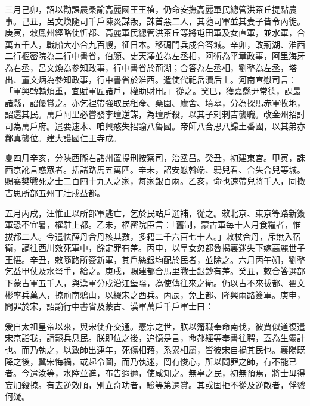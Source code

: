 \begin{pinyinscope}
 三月己卯，詔以勸課農桑諭高麗國王王禃，仍命安撫高麗軍民總管洪茶丘提點農事。己丑，呂文煥隨司千戶陳炎謀叛，誅首惡二人，其隨司軍並其妻子皆令內徙。庚寅，敕鳳州經略使忻都、高麗軍民總管洪茶丘等將屯田軍及女直軍，並水軍，合萬五千人，戰船大小合九百艘，征日本。移碉門兵戍合答城。辛卯，改荊湖、淮西二行樞密院為二行中書省，伯顏、史天澤並為左丞相，阿術為平章政事，阿里海牙為右丞，呂文煥為參知政事，行中書省於荊湖；合答為左丞相，劉整為左丞，塔出、董文炳為參知政事，行中書省於淮西。遣使代祀岳瀆后土。河南宣慰司言：「軍興轉輸煩重，宜賦軍匠諸戶，權助財用。」從之。癸巳，獲嘉縣尹常德，課最諸縣，詔優賞之。亦乞裡帶強取民租產、桑園、廬舍、墳墓，分為探馬赤軍牧地，詔還其民。萬戶阿里必嘗發李璮逆謀，為璮所殺，以其子剌剌吉襲職。改金州招討司為萬戶府。遣要速木、咱興憨失招諭八魯國。帝師八合思八歸土番國，以其弟亦鄰真襲位。建大護國仁王寺成。



 夏四月辛亥，分陜西隴右諸州置提刑按察司，治鞏昌。癸丑，初建東宮。甲寅，誅西京訛言惑眾者。括諸路馬五萬匹。辛未，詔安慰斡端、鴉兒看、合失合兒等城。賜襄樊戰死之士二百四十九人之家，每家銀百兩。乙亥，命也速帶兒將千人，同撒吉思所部五州丁壯戍益都。



 五月丙戌，汪惟正以所部軍逃亡，乞於民站戶選補，從之。敕北京、東京等路新簽軍恐不宜暑，權駐上都。乙未，樞密院臣言：「舊制，蒙古軍每十人月食糧者，惟拔都二人。今遣怯薛丹合丹核其數，多籍二千六百七十人。」敕杖合丹，斥無入宿衛，謫往西川效死軍中，餘定罪有差。丙申，以皇女忽都魯揭裏迷失下嫁高麗世子王愖。辛丑，敕隨路所簽新軍，其戶絲銀均配於民者，並除之。六月丙午朔，劉整乞益甲仗及水弩手，給之。庚戌，賜建都合馬里戰士銀鈔有差。癸丑，敕合答選部下蒙古軍五千人，與漢軍分戍沿江堡隘，為使傳往來之衛。仍以古不來拔都、翟文彬率兵萬人，掠荊南鴉山，以綴宋之西兵。丙辰，免上都、隆興兩路簽軍。庚申，問罪於宋，詔諭行中書省及蒙古、漢軍萬戶千戶軍士曰：



 爰自太祖皇帝以來，與宋使介交通。憲宗之世，朕以籓職奉命南伐，彼賈似道復遣宋京詣我，請罷兵息民。朕即位之後，追憶是言，命郝經等奉書往聘，蓋為生靈計也。而乃執之，以致師出連年，死傷相藉，系累相屬，皆彼宋自禍其民也。襄陽既降之後，冀宋悔禍，或起令圖，而乃執迷，罔有悛心，所以問罪之師，有不能已者。今遣汝等，水陸並進，布告遐邇，使咸知之。無辜之民，初無預焉，將士毋得妄加殺掠。有去逆效順，別立奇功者，驗等第遷賞。其或固拒不從及逆敵者，俘戮何疑。




\end{pinyinscope}
